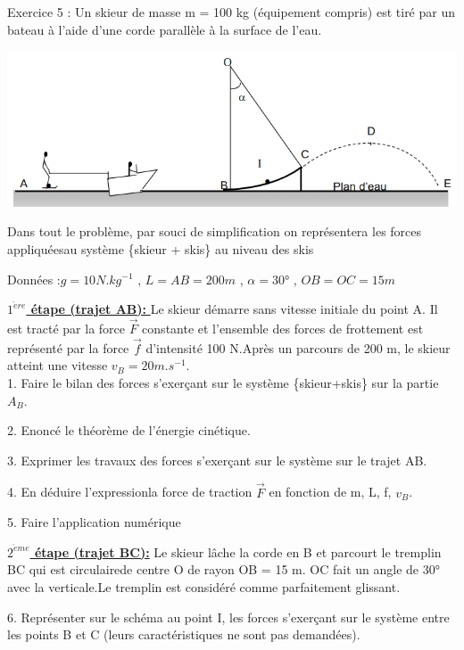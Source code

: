 \documentclass[12pt, french]{article}
\begin{document}
\begin{Box2}{Exercice 5 : }
Un skieur de masse m = 100 kg (équipement compris) est tiré par un bateau à l'aide d'une corde parallèle à la surface de l'eau. 
\begin{center}
    \includegraphics[width=1\textwidth, height =0.2\textwidth ]{./img/img01.png}
  \end{center}
Dans tout le problème, par souci de simplification on représentera les forces appliquéesau système \{skieur + skis\}  au niveau des skis

Données :$g = 10 N.kg^{-1}$ , $L = AB = 200 m$ ,  $\alpha=$30° ,  $OB = OC = 15 m$

   \underline{ \textbf{ $1^{\grave{e}re}$ étape (trajet AB): } } Le skieur démarre sans vitesse initiale du point A. Il est tracté par la force $\vec{F}$ constante et l’ensemble des forces de frottement est représenté par la force $\vec{f}$ d’intensité 100 N.Après un parcours de 200 m, le skieur atteint une vitesse $v_B= 20 m.s^{-1}$. 
\vspace{0.3cm}
\\1. Faire le bilan des forces s’exerçant sur le système \{skieur+skis\} sur la partie $A_B$.

2. Enoncé le théorème de l’énergie cinétique.

3. Exprimer les travaux des forces s’exerçant sur le système sur le trajet AB.

4. En déduire l’expressionla force de traction $\vec{F}$ en fonction de m, L, f, $v_B$.

5. Faire l’application numérique

\vspace{0.2cm}

   \underline{  \textbf{ $2^{\grave{e}me}$ étape (trajet BC):}} Le skieur lâche la corde en B et parcourt le tremplin BC qui est circulairede centre O de rayon OB = 15 m. OC fait un angle de 30° avec la verticale.Le tremplin est considéré comme parfaitement glissant.

\vspace{0.2cm}
6. Représenter sur le schéma au point I, les forces s’exerçant sur le système entre les points B et C (leurs caractéristiques ne sont pas demandées).


\end{Box2}
\end{document}
